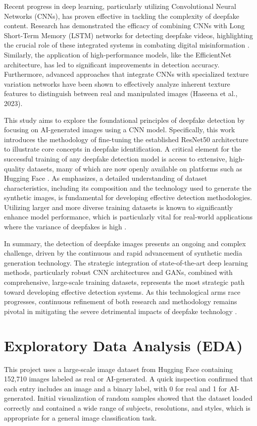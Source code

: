 \documentclass[man,12pt,letterpaper,donotrepeattitle,floatsintext]{apa7}
\begin{document}
Recent progress in deep learning, particularly utilizing Convolutional Neural Networks 
(CNNs), has proven effective in tackling the complexity of deepfake content. 
Research has demonstrated the efficacy of combining CNNs with Long Short-Term Memory 
(LSTM) networks for detecting deepfake videos, highlighting the crucial role of these 
integrated systems in combating digital misinformation \citep{Abidin2022}. 
Similarly, the application of high-performance models, like the EfficientNet architecture, 
has led to significant improvements in detection accuracy. 
Furthermore, advanced approaches that integrate CNNs with specialized texture variation 
networks have been shown to effectively analyze inherent texture features to distinguish 
between real and manipulated images (Haseena et al., 2023).

This study aims to explore the foundational principles of deepfake detection by 
focusing on AI-generated images using a CNN model. Specifically, this work introduces 
the methodology of fine-tuning the established ResNet50 architecture \citep{He2016} to 
illustrate core concepts in deepfake identification. A critical element for the successful 
training of any deepfake detection model is access to extensive, high-quality datasets, 
many of which are now openly available on platforms such as Hugging Face \citep{HuggingFace}. 
As \cite{Berrahal2023} emphasizes, a detailed understanding of dataset characteristics, 
including its composition and the technology used to generate the synthetic images, 
is fundamental for developing effective detection methodologies. Utilizing larger and 
more diverse training datasets is known to significantly enhance model performance, 
which is particularly vital for real-world applications where the variance of 
deepfakes is high \citep{Frid-Adar2018}.

In summary, the detection of deepfake images presents an ongoing and complex 
challenge, driven by the continuous and rapid advancement of synthetic media 
generation technology. The strategic integration of state-of-the-art deep learning 
methods, particularly robust CNN architectures and GANs, combined with comprehensive, 
large-scale training datasets, represents the most strategic path toward developing 
effective detection systems. As this technological arms race progresses, continuous 
refinement of both research and methodology remains pivotal in mitigating the severe 
detrimental impacts of deepfake technology \citep{Berrahal2023, Haseena2023}.


\section{Exploratory Data Analysis (EDA)}
\label{eda}
This project uses a large-scale image dataset from Hugging Face containing 152,710 
images labeled as real or AI-generated. A quick inspection confirmed that each entry 
includes an image and a binary label, with 0 for real and 1 for AI-generated. Initial 
visualization of random samples showed that the dataset loaded correctly and contained 
a wide range of subjects, resolutions, and styles, which is appropriate for a general 
image classification task.
\end{document}
